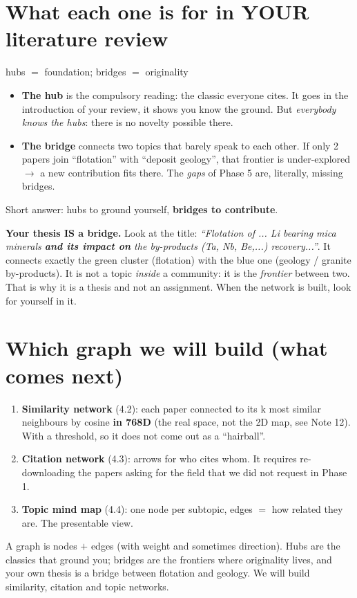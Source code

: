 \documentclass[11pt,a4paper]{article}
\begin{document}
\section{What each one is for in YOUR literature review}

\begin{concepto}{hubs $=$ foundation; bridges $=$ originality}
\begin{itemize}
  \item \textbf{The hub} is the compulsory reading: the classic everyone cites. It goes in the
        introduction of your review, it shows you know the ground. But \emph{everybody knows
        the hubs}: there is no novelty possible there.
  \item \textbf{The bridge} connects two topics that barely speak to each other. If only 2
        papers join ``flotation'' with ``deposit geology'', that frontier is under-explored
        $\rightarrow$ a new contribution fits there. The \emph{gaps} of Phase 5 are, literally,
        missing bridges.
\end{itemize}
Short answer: hubs to ground yourself, \textbf{bridges to contribute}.
\end{concepto}

\begin{ojo}
\textbf{Your thesis IS a bridge.} Look at the title: \emph{``Flotation of ... Li bearing mica
minerals \textbf{and its impact on} the by-products (Ta, Nb, Be,...) recovery...''}. It
connects exactly the green cluster (flotation) with the blue one (geology / granite
by-products). It is not a topic \emph{inside} a community: it is the \emph{frontier} between
two. That is why it is a thesis and not an assignment. When the network is built, look for
yourself in it.
\end{ojo}

\section{Which graph we will build (what comes next)}

\begin{enumerate}
  \item \textbf{Similarity network} (4.2): each paper connected to its k most similar
        neighbours by cosine \textbf{in 768D} (the real space, not the 2D map, see Note 12).
        With a threshold, so it does not come out as a ``hairball''.
  \item \textbf{Citation network} (4.3): arrows for who cites whom. It requires re-downloading
        the papers asking for the  field that we did not request in
        Phase 1.
  \item \textbf{Topic mind map} (4.4): one node per subtopic, edges $=$ how related they are.
        The presentable view.
\end{enumerate}

\begin{resumen}
A graph is nodes $+$ edges (with weight and sometimes direction). Hubs are the classics that
ground you; bridges are the frontiers where originality lives, and your own thesis is a bridge
between flotation and geology. We will build similarity, citation and topic networks.
\end{resumen}
\end{document}
